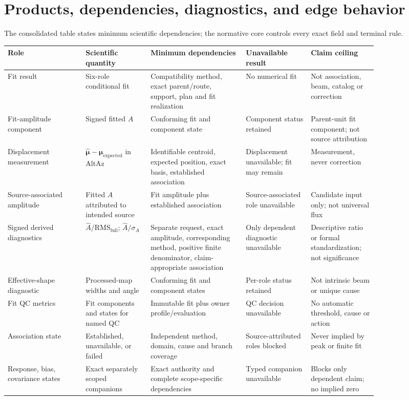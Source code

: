 \documentclass[12pt]{article}
\newcommand{\muhat}{\widehat{\boldsymbol{\mu}}}
\newcommand{\muexp}{\boldsymbol{\mu}_{\mathrm{expected}}}
\begin{document}
\section{Products, dependencies, diagnostics, and edge behavior}

The consolidated table states minimum scientific dependencies; the normative
core controls every exact field and terminal rule.

{\small
\begin{longtable}{@{}P{0.18\linewidth}P{0.15\linewidth}P{0.22\linewidth}P{0.15\linewidth}P{0.14\linewidth}@{}}
\toprule
Role & Scientific quantity & Minimum dependencies & Unavailable result & Claim ceiling \\
\midrule
\endhead
Fit result & Six-role conditional fit & Compatibility method, exact parent/route, support, plan and fit realization & No numerical fit & Not association, beam, catalog or correction \\
Fit-amplitude component & Signed fitted $A$ & Conforming fit and component state & Component status retained & Parent-unit fit component; not source attribution \\
Displacement measurement & $\muhat-\muexp$ in AltAz & Identifiable centroid, expected position, exact basis, established association & Displacement unavailable; fit may remain & Measurement, never correction \\
Source-associated amplitude & Fitted $A$ attributed to intended source & Fit amplitude plus established association & Source-associated role unavailable & Candidate input only; not universal flux \\
Signed derived diagnostics & $\widehat A/\mathrm{RMS}_{\mathrm{full}}$; $\widehat A/\sigma_A$ & Separate request, exact amplitude, corresponding method, positive finite denominator, claim-appropriate association & Only dependent diagnostic unavailable & Descriptive ratio or formal standardization; not significance \\
Effective-shape diagnostic & Processed-map widths and angle & Conforming fit and component states & Per-role status retained & Not intrinsic beam or unique cause \\
Fit QC metrics & Fit components and states for named QC & Immutable fit plus owner profile/evaluation & QC decision unavailable & No automatic threshold, cause or action \\
Association state & Established, unavailable, or failed & Independent method, domain, cause and branch coverage & Source-attributed roles blocked & Never implied by peak or finite fit \\
Response, bias, covariance states & Exact separately scoped companions & Exact authority and complete scope-specific dependencies & Typed companion unavailable & Blocks only dependent claim; no implied zero \\
\bottomrule
\end{longtable}
}
\end{document}
